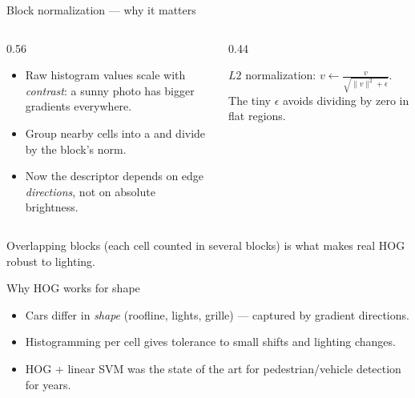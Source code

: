 \documentclass[10pt,aspectratio=169]{beamer}
\begin{document}
\begin{frame}{Block normalization — why it matters}
  \begin{columns}[T]
    \begin{column}{0.56\textwidth}
      \begin{itemize}
        \item Raw histogram values scale with \emph{contrast}: a sunny photo has bigger gradients everywhere.
        \item Group nearby cells into a  and divide by the block's norm.
        \item Now the descriptor depends on edge \emph{directions}, not on absolute brightness.
      \end{itemize}
    \end{column}
    \begin{column}{0.44\textwidth}
      \begin{mathbox}
        $L2$ normalization: $\displaystyle v \leftarrow \frac{v}{\sqrt{\lVert v\rVert^2 + \epsilon}}$.
        The tiny $\epsilon$ avoids dividing by zero in flat regions.
      \end{mathbox}
    \end{column}
  \end{columns}
  \begin{goodbox}
    Overlapping blocks (each cell counted in several blocks) is what makes real HOG robust to lighting.
  \end{goodbox}
\end{frame}

\begin{frame}{Why HOG works for shape}
  \begin{itemize}
    \item Cars differ in \emph{shape} (roofline, lights, grille) — captured by gradient directions.
    \item Histogramming per cell gives tolerance to small shifts and lighting changes.
    \item HOG + linear SVM was the state of the art for pedestrian/vehicle detection for years.
  \end{itemize}
\end{frame}
\end{document}
